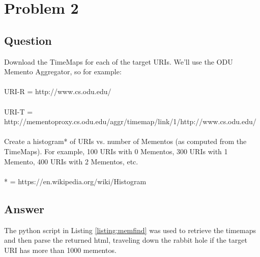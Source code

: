 \section{Problem 2}

\subsection{Question}
\vspace*{10pt}
Download the TimeMaps for each of the target URIs.  We'll use the ODU Memento Aggregator, so for example:\\
\\
URI-R = http://www.cs.odu.edu/\\
\\
URI-T = http://mementoproxy.cs.odu.edu/aggr/timemap/link/1/http://www.cs.odu.edu/\\
\\
Create a histogram* of URIs vs. number of Mementos (as computed from
the TimeMaps).  For example, 100 URIs with 0 Mementos, 300 URIs
with 1 Memento, 400 URIs with 2 Mementos, etc.\\
\\
* = https://en.wikipedia.org/wiki/Histogram
\subsection{Answer}
The python script in Listing \ref{listing:memfind} was used to retrieve the timemaps and then parse the returned html, traveling down the rabbit hole if the target URI has more than 1000 mementos.
\vspace{1mm}


